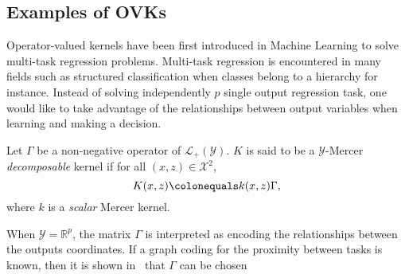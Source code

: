 \subsection{Examples of \aclp{OVK}}
\label{subsec:ovk-ex}
Operator-valued kernels have been first introduced in Machine Learning to solve
multi-task regression problems. Multi-task regression is encountered in many
fields such as structured classification when classes belong to a hierarchy for
instance. Instead of solving independently $p$ single output regression task,
one would like to take advantage of the relationships between output variables
when learning and making a decision.
\begin{definition}
    \label{dec-kernel}
    Let $\Gamma$ be a non-negative operator of $\mathcal{L}_+(\mathcal{Y})$.
    $K$ is said to be a $\mathcal{Y}$-Mercer \emph{decomposable}
    kernel if for
    all $(x,z) \in \mathcal{X}^2$,
    \begin{dmath*}
        K(x,z) \colonequals k(x,z)\Gamma,
    \end{dmath*}
    where $k$ is a \emph{scalar} Mercer kernel.
\end{definition}
When $\mathcal{Y}=\mathbb{R}^p$, the matrix $\Gamma$ is
interpreted as encoding the relationships between the outputs coordinates.
If a graph coding for the proximity between tasks is known, then it is shown
in~\citet{Evgeniou2005,Baldassare2010,Alvarez2012} that $\Gamma$ can be chosen
